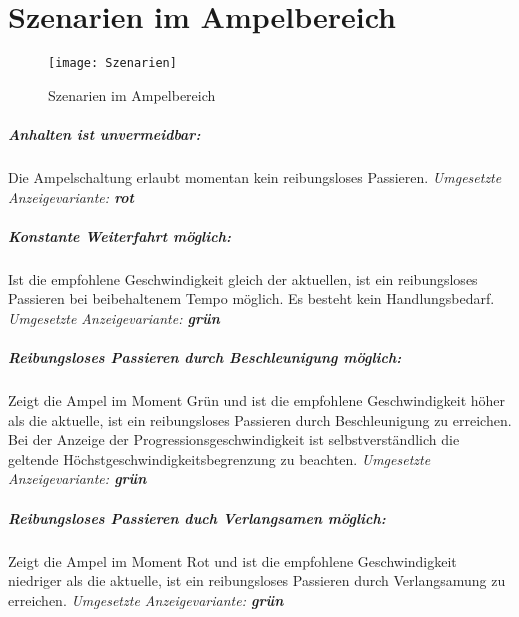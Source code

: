 \chapter{Szenarien im Ampelbereich}
\begin{figure}[H]  
    \centering  
    \texttt{[image: Szenarien]} 
    \label{fig:szenarien}
    \caption[Szenarien]{Szenarien im Ampelbereich}
\end{figure}
\paragraph{Anhalten ist unvermeidbar:} Die Ampelschaltung erlaubt momentan kein reibungsloses Passieren. 
\textit{Umgesetzte Anzeigevariante: \textbf{rot}}
\paragraph{Konstante Weiterfahrt möglich:} Ist die empfohlene Geschwindigkeit gleich der aktuellen, ist ein reibungsloses Passieren bei beibehaltenem Tempo möglich. Es besteht kein Handlungsbedarf. 
\textit{Umgesetzte Anzeigevariante: \textbf{grün}}
\paragraph{Reibungsloses Passieren durch Beschleunigung möglich:} Zeigt die Ampel im Moment Grün und ist die empfohlene Geschwindigkeit höher als die aktuelle, ist ein reibungsloses Passieren durch Beschleunigung zu erreichen. Bei der Anzeige der Progressionsgeschwindigkeit ist selbstverständlich die geltende Höchstgeschwindigkeitsbegrenzung zu beachten. 
\textit{Umgesetzte Anzeigevariante: \textbf{grün}}
\paragraph{Reibungsloses Passieren duch Verlangsamen möglich:} Zeigt die Ampel im Moment Rot und ist die empfohlene Geschwindigkeit niedriger als die aktuelle, ist ein reibungsloses Passieren durch Verlangsamung zu erreichen.
\textit{Umgesetzte Anzeigevariante: \textbf{grün}}
